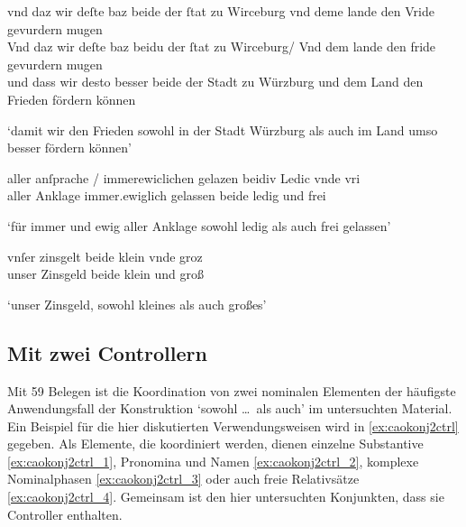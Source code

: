\begin{exe}
\ex \label{ex:intraurkvar1}
	\begin{xlist}
	\ex \label{ex:intraurkvar1_1}
		\let\eachwordthree\eachwordtwo
		\let\eachwordtwo\eachwordone
		\glll vnd daz wir deſte baz beide der ſtat zu Wirceburg vnd
				deme lande den Vride gevurdern mugen \\
			Vnd daz wir deſte baz beidu der ſtat zu Wirceburg/ Vnd
				dem lande den fride gevurdern mugen \\
			und dass wir desto besser beide der Stadt zu Würzburg und dem Land 
				den Frieden fördern können \\
		\begin{taggedline}{\parencites(Würzburg, 1289)[\pno~1126~AB, 414.36--38 bzw.~37--39]{cao2}}
		\trans `damit wir den Frieden sowohl in der Stadt Würzburg als
			auch im Land umso besser fördern können'
		\end{taggedline}
	\end{xlist}

\ex \label{ex:intraurkvar2}
	\begin{xlist}
	\ex \label{ex:intraurkvar2_1}
		\gll aller anſprache / immerewiclichen gelazen beidiv Ledic
				vnde vri \\
			aller Anklage {} immer.ewiglich gelassen beide ledig und frei \\
		\begin{taggedline}{\parencites(Bamberg, 1295)[\pno~2293, 420.23]{cao3}}
		\trans `für immer und ewig aller Anklage sowohl ledig als auch frei
			gelassen'
		\end{taggedline}

	\ex \label{ex:intraurkvar2_2}
		\gll vnſer zinsgelt beide klein vnde groz \\
			unser Zinsgeld beide klein und groß \\
		\begin{taggedline}{\pnotecite[\pno~2293, 420.30]{cao3}}
		\trans `unser Zinsgeld, sowohl kleines als auch großes'
		\end{taggedline}
	\end{xlist}
\end{exe}

\subsection{Mit zwei Controllern}
\label{subsec:caokonj2ctrl}

Mit 59 Belegen ist die Koordination von zwei nominalen Elementen der häufigste
Anwendungsfall der Konstruktion  `sowohl \dots\
als auch' im untersuchten Material. Ein Beispiel für die hier diskutierten
Verwendungsweisen wird in \cref{ex:caokonj2ctrl} gegeben. Als Elemente, die
koordiniert werden, dienen einzelne Substantive \cref{ex:caokonj2ctrl_1},
Pronomina und Namen \cref{ex:caokonj2ctrl_2}, komplexe Nominalphasen
\cref{ex:caokonj2ctrl_3} oder auch freie Relativsätze \cref{ex:caokonj2ctrl_4}.
Gemeinsam ist den hier untersuchten Konjunkten, dass sie Controller enthalten.

